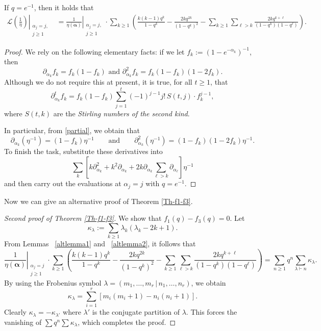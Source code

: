 \documentclass[a4paper,reqno,12pt]{amsart}
\begin{document}
\begin{lemma} \label{altlemma2} If $q=e^{-1}$, then it holds that
\begin{align*}   \left. \mathcal{L} \left(\frac1{\eta}\right) \right\vert_{\substack{\alpha_j=j, \\ j\geq 1}}
& = \left.\frac1{\eta(\pmb{\alpha})} \right\vert_{\substack{\alpha_j=j, \\ j\geq 1}}\cdot \sum_{k\geq1} \left(\frac{k(k-1)q^k}{1-q^k} - \frac{2kq^{2k}}{(1-q^k)^2} -\sum_{k\geq1}\sum_{\ell>k} \frac{2kq^{k+\ell}}{(1-q^k)(1-q^{\ell})}\right).
\end{align*}
\end{lemma}

\begin{proof} We rely on the following elementary facts: if we let 
$f_k:=(1-e^{-\alpha_k})^{-1}$, then \begin{equation}\label{partial} \partial_{\alpha_k}f_k=f_k(1-f_k) \text{ \ \ and \ \ } \partial_{\alpha_k}^2f_k=f_k(1-f_k)(1-2f_k).\end{equation}  Although we do not require this at present, it is true, for all $t\geq 1$, that
$$ \partial_{\alpha_k}^tf_k=f_k(1-f_k)\sum_{j=1}^t(-1)^{j-1}j!\,S(t,j)\cdot f_k^{j-1},$$
where $S(t,k)$ are the \emph{Stirling numbers of the second kind}. 

In particular, from \eqref{partial}, we obtain that
$$\partial_{\alpha_k}(\eta^{-1})=(1-f_k) \eta^{-1}\qquad \text{and} \qquad \partial_{\alpha_k}^2(\eta^{-1})=(1-f_k)(1-2f_k) \eta^{-1}.$$
To finish the task, substitute these derivatives into 
$$\sum_k\left[k\partial_{\alpha_k}^2+k^2\partial_{\alpha_k}+2k\partial_{\alpha_k}\sum_{\ell>k} \partial_{\alpha_{\ell}}\right]\eta^{-1}$$ 
and then carry out the evaluations at $\alpha_j=j$ with $q=e^{-1}$.
\end{proof}

Now we can give an alternative proof of Theorem \ref{Th-f1-f3}.

\begin{proof}[Second proof of Theorem \ref{Th-f1-f3}] We show that $f_1(q)-f_3(q)=0$. Let  $$\kappa_{\lambda}:=\sum_{k\geq1} \lambda_k(\lambda_k-2k+1).$$ From Lemmas ~\ref{altlemma1} and ~\ref{altlemma2}, it follows that
$$ \left.\frac1{\eta(\pmb{\alpha})} \right\vert_{\substack{\alpha_j=j\\ j\geq1}}\cdot
\sum_{k\geq1} \left(\frac{k(k-1)q^k}{1-q^k} - \frac{2kq^{2k}}{(1-q^k)^2} -\sum_{k\geq1}\sum_{\ell>k} \frac{2kq^{k+\ell}}{(1-q^k)(1-q^{\ell})}\right)
=\sum_{n\geq1} q^n \sum_{\lambda\vdash n} \kappa_{\lambda}.$$
By using the Frobenius symbol $\lambda=(m_1,\dots,m_r\, \vert \, n_1,\dots,n_r)$, we obtain 
$$\kappa_{\lambda}=\sum_{i=1}^r [m_i(m_i+1)-n_i(n_i+1)].$$
Clearly $\kappa_{\lambda}= - \kappa_{\lambda'}$ where $\lambda'$ is the conjugate partition of 
$\lambda$. This forces the vanishing of $\sum q^n\sum\kappa_{\lambda}$, which completes the proof.
\end{proof}
\end{document}
